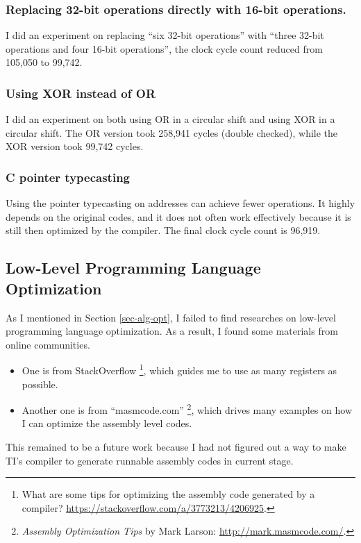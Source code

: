 \documentclass[sigconf, review=false]{acmart}
\begin{document}
\subsubsection{Replacing 32-bit operations directly with 16-bit operations.}
I did an experiment on replacing ``six 32-bit operations'' with ``three 32-bit operations and four 16-bit operations'',
the clock cycle count reduced from 105,050 to 99,742.

\subsubsection{Using XOR instead of OR}
I did an experiment on both using OR in a circular shift and using XOR in a circular shift.
The OR version took 258,941 cycles (double checked), while the XOR version took 99,742 cycles.

\subsubsection{C pointer typecasting}
Using the pointer typecasting on addresses can achieve fewer operations.
It highly depends on the original codes, and it does not often work effectively because it is still then optimized by the compiler.
The final clock cycle count is 96,919.

\subsection{Low-Level Programming Language Optimization} \label{sec-low}
As I mentioned in Section \ref{sec-alg-opt}, I failed to find researches on low-level programming language optimization.
As a result, I found some materials from online communities.

\begin{itemize}
    \item One is from StackOverflow \footnote{What are some tips for optimizing the assembly code generated by a compiler? \url{https://stackoverflow.com/a/3773213/4206925}.},
          which guides me to use as many registers as possible.
    \item Another one is from ``masmcode.com'' \footnote{\textit{Assembly Optimization Tips} by Mark Larson: \url{http://mark.masmcode.com/}.},
          which drives many examples on how I can optimize the assembly level codes.
\end{itemize}

This remained to be a future work because I had not figured out a way to make TI's compiler to generate runnable assembly codes in current stage.
\end{document}
